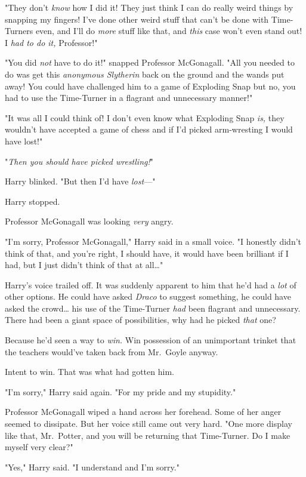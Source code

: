 "They don't \emph{know} how I did it! They just think I can do really weird 
things by snapping my fingers! I've done other weird stuff that can't be done 
with Time-Turners even, and I'll do \emph{more} stuff like that, and 
\emph{this} case won't even stand out! I \emph{had to do it,} Professor!"

"You did \emph{not} have to do it!" snapped Professor McGonagall. "All you 
needed to do was get this \emph{anonymous Slytherin} back on the ground and the 
wands put away! You could have challenged him to a game of Exploding Snap but 
no, you had to use the Time-Turner in a flagrant and unnecessary manner!"

"It was all I could think of! I don't even know what Exploding Snap \emph{is,} 
they wouldn't have accepted a game of chess and if I'd picked arm-wresting I 
would have lost!"

"\emph{Then you should have picked wrestling!}"

Harry blinked. "But then I'd have \emph{lost}---"

Harry stopped.

Professor McGonagall was looking \emph{very} angry.

"I'm sorry, Professor McGonagall," Harry said in a small voice. "I honestly 
didn't think of that, and you're right, I should have, it would have been 
brilliant if I had, but I just didn't think of that at all{\ldots}"

Harry's voice trailed off. It was suddenly apparent to him that he'd had a 
\emph{lot} of other options. He could have asked \emph{Draco} to suggest 
something, he could have asked the crowd{\ldots} his use of the Time-Turner 
\emph{had} been flagrant and unnecessary. There had been a giant space of 
possibilities, why had he picked \emph{that} one?

Because he'd seen a way to \emph{win.} Win possession of an unimportant trinket 
that the teachers would've taken back from Mr.~Goyle anyway.

Intent to win. That was what had gotten him.

"I'm sorry," Harry said again. "For my pride and my stupidity."

Professor McGonagall wiped a hand across her forehead. Some of her anger seemed 
to dissipate. But her voice still came out very hard. "One more display like 
that, Mr.~Potter, and you will be returning that Time-Turner. Do I make myself 
very clear?"

"Yes," Harry said. "I understand and I'm sorry."

